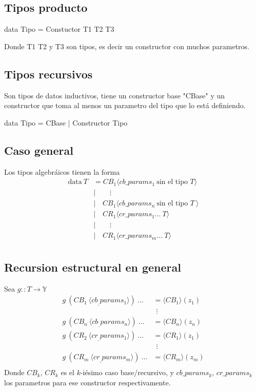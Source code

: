 \documentclass{article}
\begin{document}
\subsection{Tipos producto}
\begin{centeredhaskcode}
data Tipo = Constuctor T1 T2 T3
\end{centeredhaskcode}
Donde T1 T2 y T3 son tipos, es decir un constructor con muchos parametros.

\subsection{Tipos recursivos}
Son tipos de datos inductivos, tiene un constructor base "CBase" y un constructor que toma al menos un parametro del tipo que lo está definiendo.
\begin{centeredhaskcode}
data Tipo = CBase | Constructor Tipo
\end{centeredhaskcode}

\subsection{Caso general}
Los tipos algebráicos tienen la forma
\begin{align*}
\mathrm{data\ }T & = CB_1 \langle cb\_params_1\ \text{sin el tipo } T \rangle\\  
&| \quad\quad \vdots \\
&|\quad  CB_1 \langle cb\_params_n\ \text{sin el tipo } T\ \rangle\\
&|\quad  CR_1 \langle cr\_params_1 \dots\ T \rangle\\
&| \quad\quad \vdots \\
&|\quad  CR_1 \langle cr\_params_m \dots\ T \rangle\\
\end{align*}

\subsection{Recursion estructural en general}
Sea $g :: T \to \mathbb{Y}$
\begin{align*}
g\ (CB_1\ \langle cb_\_params_1\rangle)\ \dots&= \langle CB_1\rangle(z_1) \\
& \hspace{5pt}\vdots\\
g\ (CB_n\ \langle cb_\_params_n\rangle)\ \dots&= \langle CB_n\rangle(z_n) \\
g\ (CR_2\ \langle cr_\_params_1\rangle)\ \dots&= \langle CR_1\rangle(z_1) \\
& \hspace{5pt}\vdots\\
g\ (CR_m\ \langle cr_\_params_m\rangle)\ \dots&= \langle CR_m\rangle(z_m    ) \\
\end{align*}
Donde $CB_k$, $CR_k$ es el $k$-iésimo caso base/recursivo, y $cb\_params_k$, $cr\_params_k$ los parametros para ese constructor respectivamente.
\end{document}
